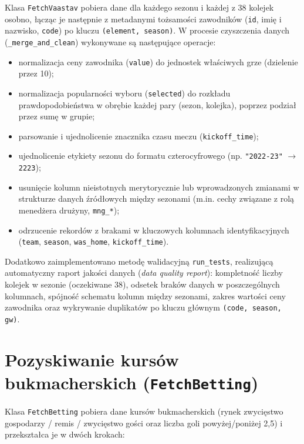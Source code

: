 \documentclass[a4paper,twoside,11pt]{mwrep}
\theoremstyle{plain} \newtheorem{thm}{Twierdzenie}
\theoremstyle{plain} \newtheorem{lem}{Lemat}
\theoremstyle{definition} \newtheorem{defn}{Definicja}
\theoremstyle{remark} \newtheorem*{rem}{Wniosek}
\begin{document}
Klasa \texttt{FetchVaastav} pobiera dane dla każdego sezonu i każdej z 38
kolejek osobno, łącząc je następnie z metadanymi tożsamości zawodników
(\texttt{id}, imię i nazwisko, \texttt{code}) po kluczu
\texttt{(element, season)}. W procesie czyszczenia danych
(\texttt{\_merge\_and\_clean}) wykonywane są następujące operacje:
\begin{itemize}
    \item normalizacja ceny zawodnika (\texttt{value}) do jednostek
    właściwych grze (dzielenie przez 10);
    \item normalizacja popularności wyboru (\texttt{selected}) do rozkładu
    prawdopodobieństwa w obrębie każdej pary (sezon, kolejka), poprzez
    podział przez sumę w grupie;
    \item parsowanie i ujednolicenie znacznika czasu meczu
    (\texttt{kickoff\_time});
    \item ujednolicenie etykiety sezonu do formatu czterocyfrowego (np.
    \texttt{"2022-23"} $\rightarrow$ \texttt{2223});
    \item usunięcie kolumn nieistotnych merytorycznie lub wprowadzonych
    zmianami w strukturze danych źródłowych między sezonami (m.in. cechy
    związane z rolą menedżera drużyny, \texttt{mng\_*});
    \item odrzucenie rekordów z brakami w kluczowych kolumnach
    identyfikacyjnych (\texttt{team}, \texttt{season}, \texttt{was\_home},
    \texttt{kickoff\_time}).
\end{itemize}

Dodatkowo zaimplementowano metodę walidacyjną \texttt{run\_tests},
realizującą automatyczny raport jakości danych (\emph{data quality report}):
kompletność liczby kolejek w sezonie (oczekiwane 38), odsetek braków
danych w poszczególnych kolumnach, spójność schematu kolumn między
sezonami, zakres wartości ceny zawodnika oraz wykrywanie duplikatów po
kluczu głównym \texttt{(code, season, gw)}.

\section{Pozyskiwanie kursów bukmacherskich (\texttt{FetchBetting})}

Klasa \texttt{FetchBetting} pobiera dane kursów bukmacherskich (rynek
zwycięstwo gospodarzy / remis / zwycięstwo gości oraz liczba goli
powyżej/poniżej 2,5) i przekształca je w dwóch krokach:
\end{document}

